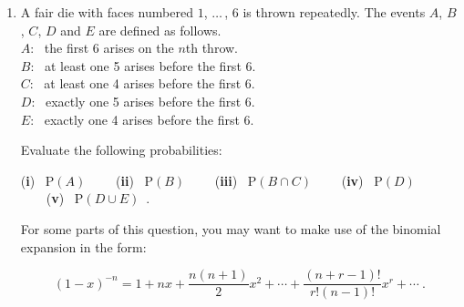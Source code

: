 \documentclass[a4, 11pt]{report}
\newlength{\qspace}
\newcounter{qnumber}
\newenvironment{question}%
 {\vspace{\qspace}
  \begin{enumerate}[\bfseries 1\quad][10]%
    \setcounter{enumi}{\value{qnumber}}%
    \item%
 }
{
  \end{enumerate}
  \filbreak
  \stepcounter{qnumber}
 }
\def\P{{\mathrm P}}
\renewcommand{\.}[1]{\ensuremath{\mathrm{#1}}}
\newcommand{\+}[1]{\ensuremath{\mathbf{#1}}}
\begin{document}
\begin{question}
A fair die with faces numbered $1$, $\ldots\,$, $6$ is thrown repeatedly. The events $A$,  $B$, $C$, $D$ and $E$ are defined as follows.\\
\hspace*{20pt} 
$A$: \ 
the first 6 arises on the $n$th throw.\\
\hspace*{20pt}
$B$: \ at least one 5 arises before the first 6. \\
\hspace*{20pt}
$C$: \ at least one 4 arises before the first 6. \\
\hspace*{20pt} 
$D$: \ exactly one 5 arises before the first 6. \\
\hspace*{20pt} 
$E$: \ exactly one 4 arises before the first 6.



Evaluate the following probabilities: 



({\bf i}) \  $\P(A)$ \ \  \ \ 
({\bf  ii}) \  $\P(B)$ \ \ \ \
({\bf iii}) \ $\P(B\cap C)$ \ \ \ \ 
({\bf iv}) \ $\P(D)$ \ \ \ \ 
({\bf v}) 
 \ $\P(D\cup E)$
\,.



\noindent

For some parts of this question, you may want to make use of the binomial expansion in the form:

\[
(1-x)^{-n} = 1 +nx +\frac {n(n+1)}2 x^2 + \cdots + 
\frac {(n+r-1)!}{r! (n-1)!}x^r +\cdots
\ .
\]
\end{question}
\end{document}
